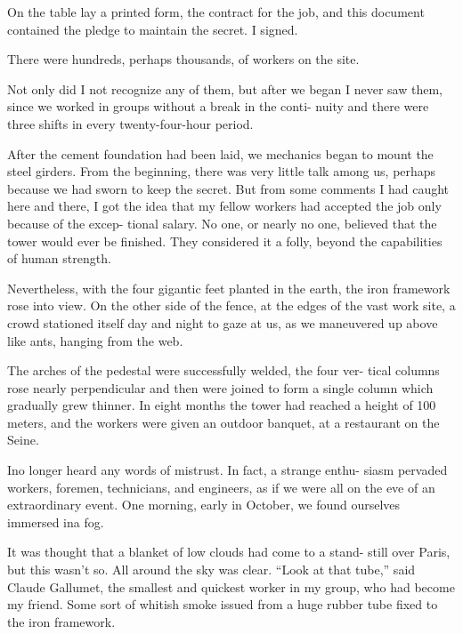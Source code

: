 \documentclass[12pt]{article}
\begin{document}
On the table lay a printed form, the contract for the job, and this
document contained the pledge to maintain the secret. I signed.

There were hundreds, perhaps thousands, of workers on the site.

Not only did I not recognize any of them, but after we began I never
saw them, since we worked in groups without a break in the conti-
nuity and there were three shifts in every twenty-four-hour period.

After the cement foundation had been laid, we mechanics began
to mount the steel girders. From the beginning, there was very little
talk among us, perhaps because we had sworn to keep the secret. But
from some comments I had caught here and there, I got the idea that
my fellow workers had accepted the job only because of the excep-
tional salary. No one, or nearly no one, believed that the tower would
ever be finished. They considered it a folly, beyond the capabilities of
human strength.

Nevertheless, with the four gigantic feet planted in the earth, the
iron framework rose into view. On the other side of the fence, at the
edges of the vast work site, a crowd stationed itself day and night to
gaze at us, as we maneuvered up above like ants, hanging from the
web.

The arches of the pedestal were successfully welded, the four ver-
tical columns rose nearly perpendicular and then were joined to form
a single column which gradually grew thinner. In eight months the
tower had reached a height of 100 meters, and the workers were given
an outdoor banquet, at a restaurant on the Seine.

Ino longer heard any words of mistrust. In fact, a strange enthu-
siasm pervaded workers, foremen, technicians, and engineers, as if
we were all on the eve of an extraordinary event. One morning, early
in October, we found ourselves immersed ina fog.

It was thought that a blanket of low clouds had come to a stand-
still over Paris, but this wasn’t so. All around the sky was clear. “Look
at that tube,” said Claude Gallumet, the smallest and quickest worker
in my group, who had become my friend. Some sort of whitish
smoke issued from a huge rubber tube fixed to the iron framework.
\end{document}
